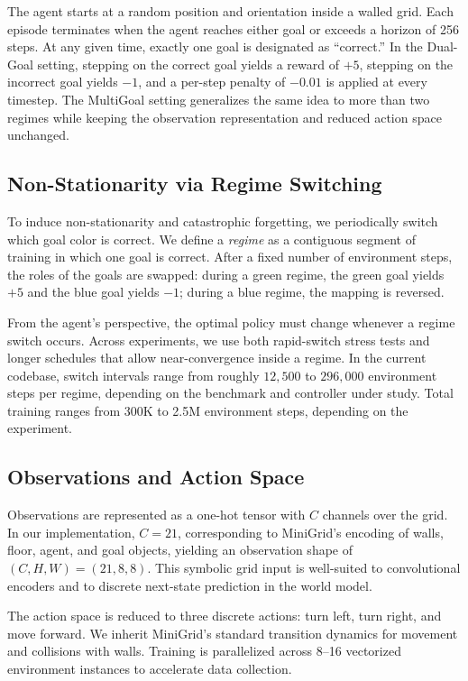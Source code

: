 ﻿\documentclass[sigconf]{acmart}
\begin{document}
The agent starts at a random position and orientation inside a walled grid. Each episode terminates when the agent reaches either goal or exceeds a horizon of 256 steps. At any given time, exactly one goal is designated as ``correct.'' In the Dual-Goal setting, stepping on the correct goal yields a reward of $+5$, stepping on the incorrect goal yields $-1$, and a per-step penalty of $-0.01$ is applied at every timestep. The MultiGoal setting generalizes the same idea to more than two regimes while keeping the observation representation and reduced action space unchanged.

\subsection{Non-Stationarity via Regime Switching}
To induce non-stationarity and catastrophic forgetting, we periodically switch which goal color is correct. We define a \emph{regime} as a contiguous segment of training in which one goal is correct. After a fixed number of environment steps, the roles of the goals are swapped: during a green regime, the green goal yields $+5$ and the blue goal yields $-1$; during a blue regime, the mapping is reversed.

From the agent's perspective, the optimal policy must change whenever a regime switch occurs. Across experiments, we use both rapid-switch stress tests and longer schedules that allow near-convergence inside a regime. In the current codebase, switch intervals range from roughly $12{,}500$ to $296{,}000$ environment steps per regime, depending on the benchmark and controller under study. Total training ranges from 300K to 2.5M environment steps, depending on the experiment.

\subsection{Observations and Action Space}
Observations are represented as a one-hot tensor with $C$ channels over the grid. In our implementation, $C = 21$, corresponding to MiniGrid's encoding of walls, floor, agent, and goal objects, yielding an observation shape of $(C, H, W) = (21, 8, 8)$. This symbolic grid input is well-suited to convolutional encoders and to discrete next-state prediction in the world model.

The action space is reduced to three discrete actions: turn left, turn right, and move forward. We inherit MiniGrid's standard transition dynamics for movement and collisions with walls. Training is parallelized across 8--16 vectorized environment instances to accelerate data collection.
\end{document}
